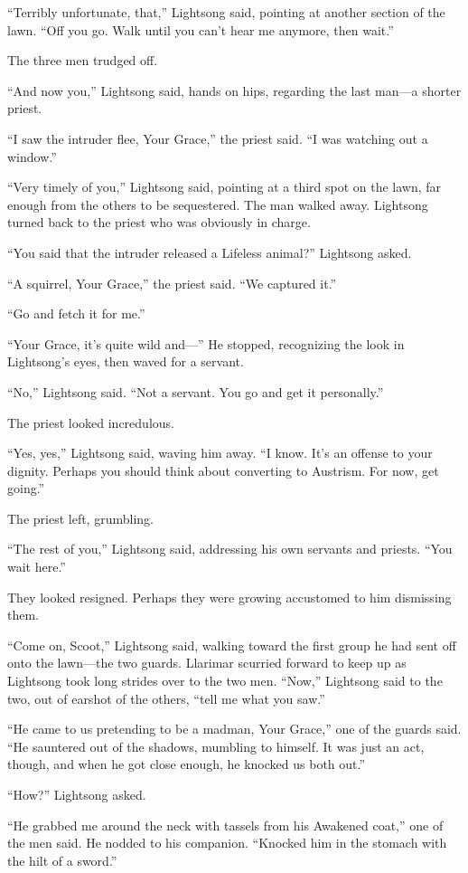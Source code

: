 “Terribly unfortunate, that,” Lightsong said, pointing at another section of the lawn. “Off you go. Walk until you can’t hear me anymore, then wait.”

The three men trudged off.

“And now you,” Lightsong said, hands on hips, regarding the last man—a shorter priest.

“I saw the intruder flee, Your Grace,” the priest said. “I was watching out a window.”

“Very timely of you,” Lightsong said, pointing at a third spot on the lawn, far enough from the others to be sequestered. The man walked away. Lightsong turned back to the priest who was obviously in charge.

“You said that the intruder released a Lifeless animal?” Lightsong asked.

“A squirrel, Your Grace,” the priest said. “We captured it.”

“Go and fetch it for me.”

“Your Grace, it’s quite wild and—” He stopped, recognizing the look in Lightsong’s eyes, then waved for a servant.

“No,” Lightsong said. “Not a servant. You go and get it personally.”

The priest looked incredulous.

“Yes, yes,” Lightsong said, waving him away. “I know. It’s an offense to your dignity. Perhaps you should think about converting to Austrism. For now, get going.”

The priest left, grumbling.

“The rest of you,” Lightsong said, addressing his own servants and priests. “You wait here.”

They looked resigned. Perhaps they were growing accustomed to him dismissing them.

“Come on, Scoot,” Lightsong said, walking toward the first group he had sent off onto the lawn—the two guards. Llarimar scurried forward to keep up as Lightsong took long strides over to the two men. “Now,” Lightsong said to the two, out of earshot of the others, “tell me what you saw.”

“He came to us pretending to be a madman, Your Grace,” one of the guards said. “He sauntered out of the shadows, mumbling to himself. It was just an act, though, and when he got close enough, he knocked us both out.”

“How?” Lightsong asked.

“He grabbed me around the neck with tassels from his Awakened coat,” one of the men said. He nodded to his companion. “Knocked him in the stomach with the hilt of a sword.”

